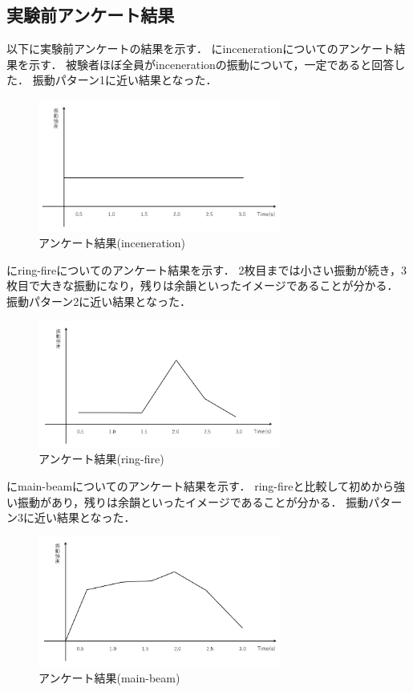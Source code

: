 \subsection{実験前アンケート結果}
以下に実験前アンケートの結果を示す．
にincenerationについてのアンケート結果を示す．
被験者ほぼ全員がincenerationの振動について，一定であると回答した．
振動パターン1に近い結果となった．
\begin{figure}[h]
\centering
\includegraphics[clip,width=8cm]{fig/incenerationAve.png}
\caption{アンケート結果(inceneration)}\label{inceA}
\end{figure}


にring-fireについてのアンケート結果を示す．
2枚目までは小さい振動が続き，3枚目で大きな振動になり，残りは余韻といったイメージであることが分かる．
振動パターン2に近い結果となった．
\begin{figure}[h]
\centering
\includegraphics[clip,width=8cm]{fig/ringfireAve.png}
\caption{アンケート結果(ring-fire)}\label{ringA}
\end{figure}



にmain-beamについてのアンケート結果を示す．
ring-fireと比較して初めから強い振動があり，残りは余韻といったイメージであることが分かる．
振動パターン3に近い結果となった．
\begin{figure}[h]
\centering
\includegraphics[clip,width=8cm]{fig/mainbeamAve.png}
\caption{アンケート結果(main-beam)}\label{mainA}
\end{figure}

